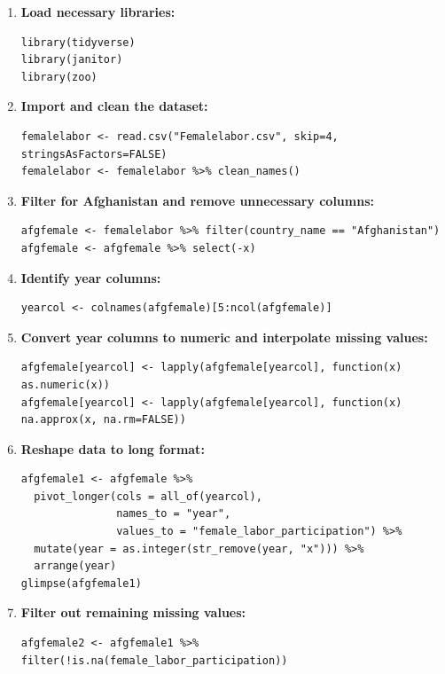 \documentclass{article}
\begin{document}
\begin{enumerate}
    \item \textbf{Load necessary libraries:}
\begin{verbatim}
library(tidyverse)
library(janitor)
library(zoo)
\end{verbatim}

    \item \textbf{Import and clean the dataset:}
\begin{verbatim}
femalelabor <- read.csv("Femalelabor.csv", skip=4, stringsAsFactors=FALSE)
femalelabor <- femalelabor %>% clean_names()
\end{verbatim}

    \item \textbf{Filter for Afghanistan and remove unnecessary columns:}
\begin{verbatim}
afgfemale <- femalelabor %>% filter(country_name == "Afghanistan")
afgfemale <- afgfemale %>% select(-x)
\end{verbatim}

    \item \textbf{Identify year columns:}
\begin{verbatim}
yearcol <- colnames(afgfemale)[5:ncol(afgfemale)]
\end{verbatim}

    \item \textbf{Convert year columns to numeric and interpolate missing values:}
\begin{verbatim}
afgfemale[yearcol] <- lapply(afgfemale[yearcol], function(x) as.numeric(x))
afgfemale[yearcol] <- lapply(afgfemale[yearcol], function(x) na.approx(x, na.rm=FALSE))
\end{verbatim}

    \item \textbf{Reshape data to long format:}
\begin{verbatim}
afgfemale1 <- afgfemale %>%
  pivot_longer(cols = all_of(yearcol),
               names_to = "year",
               values_to = "female_labor_participation") %>%
  mutate(year = as.integer(str_remove(year, "x"))) %>%
  arrange(year)
glimpse(afgfemale1)
\end{verbatim}

    \item \textbf{Filter out remaining missing values:}
\begin{verbatim}
afgfemale2 <- afgfemale1 %>% filter(!is.na(female_labor_participation))
\end{verbatim}

\end{enumerate}
\end{document}

